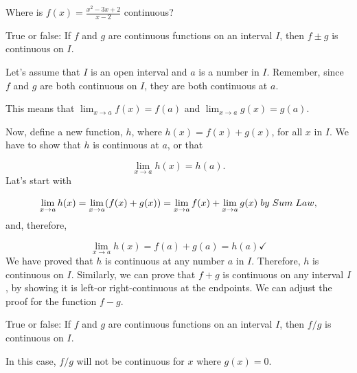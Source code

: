 \documentclass{ximera}
\begin{document}
\begin{question}
  Where is $f(x) = \frac{x^2-3x+2}{x-2}$ continuous?
  \begin{prompt}
  \begin{multipleChoice}
  \end{multipleChoice}
  \end{prompt}
\end{question}
\begin{question}
  True or false: If $f$ and $g$ are continuous functions on an
  interval $I$, then $f\pm g$ is continuous on $I$.
  \begin{prompt}
  \begin{multipleChoice}
  \end{multipleChoice}
  \begin{feedback}
     Let's assume that $I$ is an open interval and $a$ is a number in $I$. Remember, since $f$ and $g$ are both continuous on $I$, they are both continuous at $a$. 
     
     This means that $ \lim_{x\to a}f(x)=f(a)$ and $ \lim_{x\to a}g(x)=g(a)$.
     
      Now, define a new function, $h$, where $h(x)= f(x)+g(x)$, for all $x$ in $I$. We have to show that $h$ is continuous at $a$, or that
    
    \[
    \lim_{x\to a} h(x) = h(a).
    \]
    Lat's start with
     
    \[
    \lim_{x\to a} h(x) =  \lim_{x\to a} (f(x)+g(x)) = \lim_{x\to a} f(x)+\lim_{x\to a}g(x)\hspace{0.04in}by \hspace{0.04in}Sum\hspace{0.04in} Law,
    \]
    and, therefore,
    
     \[
    \lim_{x\to a} h(x) =  f(a)+g(a)=h(a) \checkmark
    \]
We have proved that $h$ is continuous at  any number $a$ in $I$. Therefore, $h$ is continuous on $I$.
Similarly, we can prove that $f+g$ is continuous on any interval $I$, by showing it is left-or right-continuous at the endpoints.
We can adjust the proof for the function $f-g$.
  \end{feedback}
  \end{prompt}
\end{question}

\begin{question}
  True or false: If $f$ and $g$ are continuous functions on an
  interval $I$, then $f/g$ is continuous on $I$.
  \begin{prompt}
  \begin{multipleChoice}
  \end{multipleChoice}
  \begin{feedback}
    In this case, $f/g$ will not be continuous for $x$ where $g(x) =
    0$.
  \end{feedback}
  \end{prompt}
\end{question}
\end{document}
